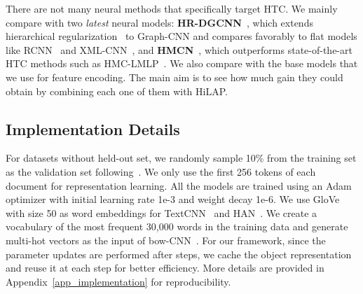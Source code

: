 \documentclass[11pt,a4paper]{article}
\newcommand{\start}[1]{\vspace{1.8mm}\noindent{{\bf #1}}}
\begin{document}
\start{2. Neural HTC Methods.}
There are not many neural methods that specifically target HTC. 
We mainly compare with two \textit{latest} neural models: \textbf{HR-DGCNN}~\citep{peng2018large}, which extends hierarchical regularization~\citep{gopal2013recursive} to Graph-CNN and compares favorably to flat models like RCNN~\cite{lai2015recurrent} and XML-CNN~\cite{liu2017deep}, and \textbf{HMCN}~\citep{wehrmann2018hierarchical}, which outperforms state-of-the-art HTC methods such as HMC-LMLP~\cite{cerri2016reduction}.
We also compare with the base models that we use for feature encoding.
The main aim is to see how much gain they could obtain by combining each one of them with HiLAP.


\subsection{Implementation Details}
For datasets without held-out set, we randomly sample 10\% from the training set as the validation set following~\citet{johnson2014effective,peng2018large}.
We only use the first 256 tokens of each document for representation learning.
All the models are trained using an Adam optimizer with initial learning rate 1e-3 and weight decay 1e-6.
We use GloVe~\citep{pennington2014glove} with size 50 as word embeddings for TextCNN~\cite{kim2014convolutional} and HAN~\cite{yang2016hierarchical}.
We create a vocabulary of the most frequent 30,000 words in the training data and generate multi-hot vectors as the input of bow-CNN~\cite{johnson2014effective}.
For our framework, since the parameter updates are performed after  steps, we cache the object representation  and reuse it at each step for better efficiency.
More details are provided in Appendix~\ref{app_implementation} for reproducibility.
\end{document}
